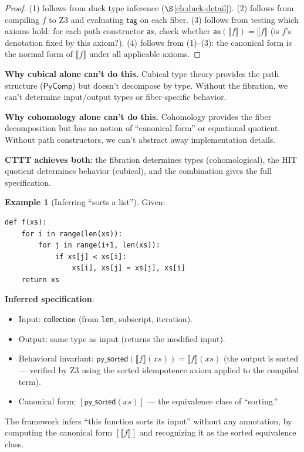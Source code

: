 \documentclass[11pt,a4paper]{report}
\theoremstyle{definition}
\newtheorem{example}[definition]{Example}
\theoremstyle{plain}
\newcommand{\den}[1]{\llbracket #1 \rrbracket}
\begin{document}
\begin{proof}
(1) follows from duck type inference ($\S$\ref{ch:duck-detail}).
(2) follows from compiling $f$ to Z3 and evaluating $\mathsf{tag}$
on each fiber.
(3) follows from testing which axioms hold: for each path constructor
$\mathsf{ax}$, check whether $\mathsf{ax}(\den{f}) = \den{f}$
(is $f$'s denotation fixed by this axiom?).
(4) follows from (1)--(3): the canonical form is the normal form of
$\den{f}$ under all applicable axioms.
\end{proof}

\textbf{Why cubical alone can't do this.}
Cubical type theory provides the path structure ($\mathsf{PyComp}$)
but doesn't decompose by type.  Without the fibration, we can't
determine input/output types or fiber-specific behavior.

\textbf{Why cohomology alone can't do this.}
Cohomology provides the fiber decomposition but has no notion of
``canonical form'' or equational quotient.  Without path constructors,
we can't abstract away implementation details.

\textbf{CTTT achieves both}: the fibration determines types (cohomological),
the HIT quotient determines behavior (cubical), and the combination
gives the full specification.

\begin{example}[Inferring ``sorts a list'']
Given:
\begin{lstlisting}
def f(xs):
    for i in range(len(xs)):
        for j in range(i+1, len(xs)):
            if xs[j] < xs[i]:
                xs[i], xs[j] = xs[j], xs[i]
    return xs
\end{lstlisting}

\textbf{Inferred specification}:
\begin{itemize}
  \item Input: $\mathsf{collection}$ (from \texttt{len}, subscript,
    iteration).
  \item Output: same type as input (returns the modified input).
  \item Behavioral invariant: $\mathsf{py\_sorted}(\den{f}(xs)) =
    \den{f}(xs)$ (the output is sorted --- verified by Z3 using
    the sorted idempotence axiom applied to the compiled term).
  \item Canonical form: $[\mathsf{py\_sorted}(xs)]$ --- the
    equivalence class of ``sorting.''
\end{itemize}

The framework infers ``this function sorts its input'' without any
annotation, by computing the canonical form $[\den{f}]$ and
recognizing it as the sorted equivalence class.
\end{example}
\end{document}
